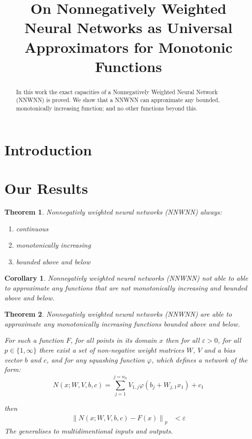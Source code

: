 \documentclass{article} %
\title{On Nonnegatively Weighted Neural Networks as Universal Approximators for Monotonic Functions}
\newtheorem{thm}{Theorem}
\newtheorem{cor}{Corollary}[thm]
\begin{document}
\maketitle

\begin{abstract}
In this work the exact capacities of a Nonnegatively Weighted Neural Network (NNWNN) is proved.
We show that a NNWNN can approximate any bounded, monotonically increasing function;
and no other functions beyond this.
\end{abstract}


\section{Introduction}

\section{Our Results}

\begin{thm} \label{thm:upper}
	Nonnegativly weighted neural networks (NNWNN) always:
	
	\begin{enumerate}
		\item continuous 
		\item monotonically increasing
		\item bounded above and below
	\end{enumerate}
\end{thm}
\begin{cor}\label{}
	Nonnegativly weighted neural networks (NNWNN) not able to able to approximate any functions that are not monotonically increasing and bounded above and below.
\end{cor}

\begin{thm} \label{thm:nnwnnuat}
	Nonnegativly weighted neural networks (NNWNN) are able to approximate any monotonically increasing functions bounded above and below.
	
	
	For such a function $F$,
	for all points in its domain $x$
	then for all $\varepsilon > 0$, for all $p\in \lbrace 1, \infty \rbrace$
	there exist a set of non-negative weight matrices $W$, $V$ and a bias vector $b$ and $c$,
	and for any squashing function $\varphi$,
	which defines a network of the form:
	\begin{equation}
		N(x;W,V,b,c)=\sum_{j=1}^{j=n_{h}}V_{1,j}\varphi(b_{j}+W_{j,1}x_{1})+c_{1}
	\end{equation}
	
	then 
	\begin{align}
	\left\| N(x;W,V,b, c) - F(x) \right\|_p &< \varepsilon
	\end{align}
	The generalises to multidimentional inputs and outputs.
\end{thm}
\end{document}
